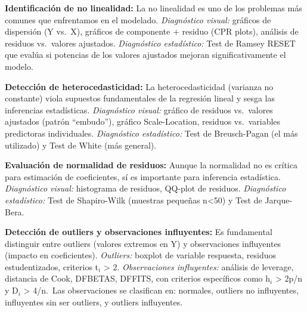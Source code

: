 \documentclass[
  letterpaper,
  DIV=11,
  numbers=noendperiod]{scrreprt}
\begin{document}
\begin{tcolorbox}[enhanced jigsaw, leftrule=.75mm, breakable, colbacktitle=quarto-callout-note-color!10!white, bottomrule=.15mm, colframe=quarto-callout-note-color-frame, toprule=.15mm, colback=white, coltitle=black, bottomtitle=1mm, left=2mm, title=\textcolor{quarto-callout-note-color}{\faInfo}\hspace{0.5em}{Recordatorio: Diagnóstico de problemas en regresión lineal}, opacityback=0, arc=.35mm, opacitybacktitle=0.6, toptitle=1mm, titlerule=0mm, rightrule=.15mm]

\textbf{Identificación de no linealidad:} La no linealidad es uno de los
problemas más comunes que enfrentamos en el modelado. \emph{Diagnóstico
visual:} gráficos de dispersión (Y vs.~X), gráficos de componente +
residuo (CPR plots), análisis de residuos vs.~valores ajustados.
\emph{Diagnóstico estadístico:} Test de Ramsey RESET que evalúa si
potencias de los valores ajustados mejoran significativamente el modelo.

\textbf{Detección de heterocedasticidad:} La heterocedasticidad
(varianza no constante) viola supuestos fundamentales de la regresión
lineal y sesga las inferencias estadísticas. \emph{Diagnóstico visual:}
gráfico de residuos vs.~valores ajustados (patrón ``embudo''), gráfico
Scale-Location, residuos vs.~variables predictoras individuales.
\emph{Diagnóstico estadístico:} Test de Breusch-Pagan (el más utilizado)
y Test de White (más general).

\textbf{Evaluación de normalidad de residuos:} Aunque la normalidad no
es crítica para estimación de coeficientes, sí es importante para
inferencia estadística. \emph{Diagnóstico visual:} histograma de
residuos, QQ-plot de residuos. \emph{Diagnóstico estadístico:} Test de
Shapiro-Wilk (muestras pequeñas n\textless50) y Test de Jarque-Bera.

\textbf{Detección de outliers y observaciones influyentes:} Es
fundamental distinguir entre outliers (valores extremos en Y) y
observaciones influyentes (impacto en coeficientes). \emph{Outliers:}
boxplot de variable respuesta, residuos estudentizados, criterios
\textbar t\(_i\)\textbar{} \textgreater{} 2. \emph{Observaciones
influyentes:} análisis de leverage, distancia de Cook, DFBETAS, DFFITS,
con criterios específicos como h\(_i\) \textgreater{} 2p/n y D\(_i\)
\textgreater{} 4/n.~Las observaciones se clasifican en: normales,
outliers no influyentes, influyentes sin ser outliers, y outliers
influyentes.

\end{tcolorbox}
\end{document}
